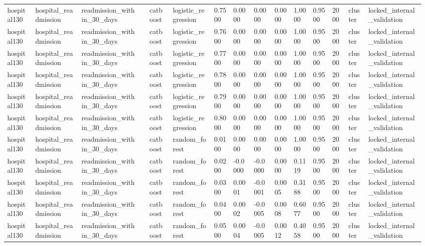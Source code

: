 \begin{tabular}{lllllllllllllll}
hospital130 & hospital\_readmission & readmission\_within\_30\_days &  & catboost & logistic\_regression & 0.7500 & 0.0000 & 0.0000 & 0.0000 & 1.0000 & 0.9500 & 2000 & cluster & locked\_internal\_validation \\
hospital130 & hospital\_readmission & readmission\_within\_30\_days &  & catboost & logistic\_regression & 0.7600 & 0.0000 & 0.0000 & 0.0000 & 1.0000 & 0.9500 & 2000 & cluster & locked\_internal\_validation \\
hospital130 & hospital\_readmission & readmission\_within\_30\_days &  & catboost & logistic\_regression & 0.7700 & 0.0000 & 0.0000 & 0.0000 & 1.0000 & 0.9500 & 2000 & cluster & locked\_internal\_validation \\
hospital130 & hospital\_readmission & readmission\_within\_30\_days &  & catboost & logistic\_regression & 0.7800 & 0.0000 & 0.0000 & 0.0000 & 1.0000 & 0.9500 & 2000 & cluster & locked\_internal\_validation \\
hospital130 & hospital\_readmission & readmission\_within\_30\_days &  & catboost & logistic\_regression & 0.7900 & 0.0000 & 0.0000 & 0.0000 & 1.0000 & 0.9500 & 2000 & cluster & locked\_internal\_validation \\
hospital130 & hospital\_readmission & readmission\_within\_30\_days &  & catboost & logistic\_regression & 0.8000 & 0.0000 & 0.0000 & 0.0000 & 1.0000 & 0.9500 & 2000 & cluster & locked\_internal\_validation \\
hospital130 & hospital\_readmission & readmission\_within\_30\_days &  & catboost & random\_forest & 0.0100 & 0.0000 & 0.0000 & 0.0000 & 1.0000 & 0.9500 & 2000 & cluster & locked\_internal\_validation \\
hospital130 & hospital\_readmission & readmission\_within\_30\_days &  & catboost & random\_forest & 0.0200 & -0.0000 & -0.0000 & 0.0000 & 0.1119 & 0.9500 & 2000 & cluster & locked\_internal\_validation \\
hospital130 & hospital\_readmission & readmission\_within\_30\_days &  & catboost & random\_forest & 0.0300 & 0.0001 & -0.0001 & 0.0005 & 0.3188 & 0.9500 & 2000 & cluster & locked\_internal\_validation \\
hospital130 & hospital\_readmission & readmission\_within\_30\_days &  & catboost & random\_forest & 0.0400 & 0.0002 & -0.0005 & 0.0008 & 0.6077 & 0.9500 & 2000 & cluster & locked\_internal\_validation \\
hospital130 & hospital\_readmission & readmission\_within\_30\_days &  & catboost & random\_forest & 0.0500 & 0.0004 & -0.0005 & 0.0012 & 0.4058 & 0.9500 & 2000 & cluster & locked\_internal\_validation \\

\end{tabular}
